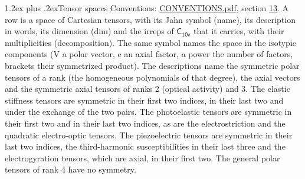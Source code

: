 \documentclass[10pt,a4paper]{article}
\makeatletter
\renewcommand\section{\@startsection{section}{1}{\z@}{-3ex plus -1ex minus -.2ex}%
  {1.2ex plus .2ex}{\normalfont\large\sffamily\bfseries\color{parttitle}}}
\numberwithin{equation}{section}
\newcommand{\grp}[1]{\mathsf{#1}}
\makeatother
\begin{document}
\section{Tensor spaces}\label{s:tensor_spaces}
Conventions: \href{../../CONVENTIONS.pdf}{CONVENTIONS.pdf}, section \href{../../CONVENTIONS.pdf\#conv.13}{13}.
\leavevmode\label{n:head.name}\label{n:head.description}\label{n:head.dim}\label{n:head.decomposition}A row is a space of Cartesian tensors, with its Jahn symbol (name), its description in words, its dimension (dim) and the irreps of $\grp{C_{10v}}$ that it carries, with their multiplicities (decomposition). \label{n:label.jahn}The same symbol names the space in the isotypic components (V a polar vector, e an axial factor, a power the number of factors, brackets their symmetrized product). The descriptions name the symmetric polar tensors of a rank (the homogeneous polynomials of that degree), the axial vectors and the symmetric axial tensors of ranks 2 (optical activity) and 3. The elastic stiffness tensors are symmetric in their first two indices, in their last two and under the exchange of the two pairs. The photoelastic tensors are symmetric in their first two and in their last two indices, as are the electrostriction and the quadratic electro-optic tensors. The piezoelectric tensors are symmetric in their last two indices, the third-harmonic susceptibilities in their last three and the electrogyration tensors, which are axial, in their first two. The general polar tensors of rank 4 have no symmetry.
\end{document}
